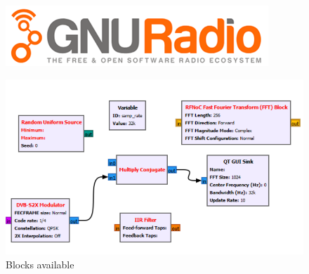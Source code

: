 \begin{frame}
\begin{columns}
        \begin{column}{0.5\textwidth}
            \begin{figure}[t]
                \centering
                \includegraphics[width=\linewidth]{img/GNU_radio_logo.png}
                \label{fig:gnu_radio_logo}
            \end{figure}
            \begin{figure}
                \centering
                \includegraphics[width=\linewidth]{img/block-diagrams.png}
                 \caption{Blocks available}
                \label{fig:blocks_gnu}
            \end{figure}
        \end{column}
    \end{columns}
	
\end{frame}

